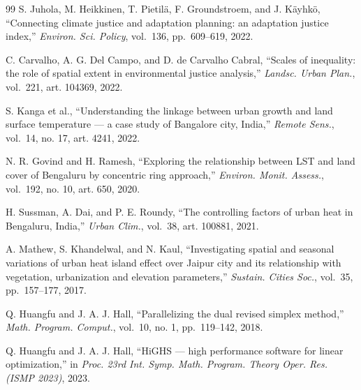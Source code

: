 \documentclass[conference]{IEEEtran}
\begin{document}
\begin{thebibliography}{99}
 S. Juhola, M. Heikkinen, T. Pietilä, F. Groundstroem, and J. Käyhkö, ``Connecting climate justice
and adaptation planning: an adaptation justice index,'' \emph{Environ. Sci. Policy}, vol.~136, pp.~609--619,
2022.


 C. Carvalho, A. G. Del Campo, and D. de Carvalho Cabral, ``Scales of inequality: the role of spatial
extent in environmental justice analysis,'' \emph{Landsc. Urban Plan.}, vol.~221, art. 104369, 2022.


 S. Kanga et al., ``Understanding the linkage between urban growth and land surface temperature ---
a case study of Bangalore city, India,'' \emph{Remote Sens.}, vol.~14, no. 17, art. 4241, 2022.


 N. R. Govind and H. Ramesh, ``Exploring the relationship between LST and land cover of Bengaluru by
concentric ring approach,'' \emph{Environ. Monit. Assess.}, vol.~192, no. 10, art. 650, 2020.


 H. Sussman, A. Dai, and P. E. Roundy, ``The controlling factors of urban heat in Bengaluru,
India,'' \emph{Urban Clim.}, vol.~38, art. 100881, 2021.


 A. Mathew, S. Khandelwal, and N. Kaul, ``Investigating spatial and seasonal variations of urban
heat island effect over Jaipur city and its relationship with vegetation, urbanization and elevation
parameters,'' \emph{Sustain. Cities Soc.}, vol.~35, pp.~157--177, 2017.


 Q. Huangfu and J. A. J. Hall, ``Parallelizing the dual revised simplex method,'' \emph{Math. Program.
Comput.}, vol.~10, no. 1, pp.~119--142, 2018.


 Q. Huangfu and J. A. J. Hall, ``HiGHS --- high performance software for linear optimization,'' in
\emph{Proc. 23rd Int. Symp. Math. Program. Theory Oper. Res. (ISMP 2023)}, 2023.
\end{thebibliography}
\end{document}
